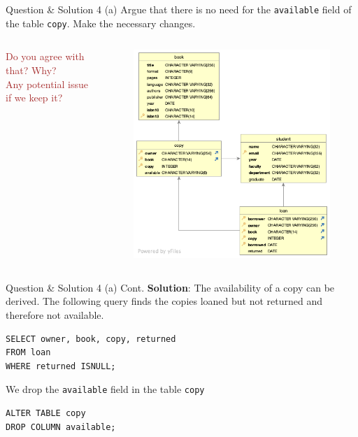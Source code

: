 \begin{frame}[fragile]{Question \& Solution 4 (a)}
Argue that there is no need for the \texttt{available} field of the table \texttt{copy}. Make the necessary changes.
\begin{columns}
\textcolor{brown}{Do you agree with that? Why?}\\
\textcolor{brown}{Any potential issue if we keep it?}
\begin{figure}
	\includegraphics[width=1\textwidth]{t1/images/t1-0.png}
\end{figure}
\end{columns}

\end{frame}

\begin{frame}[fragile]{Question \& Solution 4 (a) Cont.}
\textbf{Solution}:
The availability of a copy can be derived. \vspace{10pt}
The following query finds the copies loaned but not returned and therefore not available.
\begin{lstlisting}
SELECT owner, book, copy, returned 
FROM loan 
WHERE returned ISNULL;
\end{lstlisting}

We drop the \texttt{available} field in the table \texttt{copy}

\begin{lstlisting}
ALTER TABLE copy
DROP COLUMN available;
\end{lstlisting}

\end{frame}

